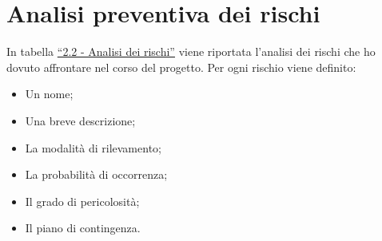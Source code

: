 \section{Analisi preventiva dei rischi}
In tabella {\hyperref[tab:ab:rischi]{``2.2 - Analisi dei rischi''}} viene riportata l'analisi dei rischi che ho dovuto affrontare nel corso del progetto. Per ogni rischio viene definito:

\begin{itemize}
    \item Un nome;
    \item Una breve descrizione;
    \item La modalità di rilevamento;
    \item La probabilità di occorrenza;
    \item Il grado di pericolosità;
    \item Il piano di contingenza.
\end{itemize}

